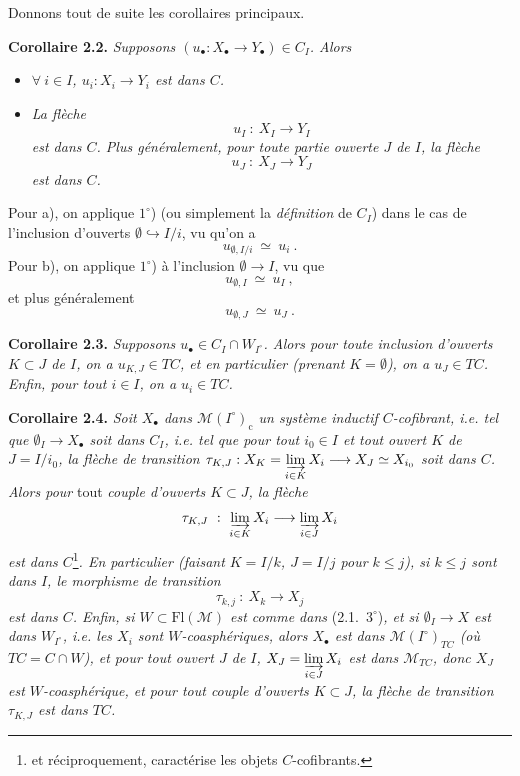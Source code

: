 \documentclass[11pt]{article}
\newcommand{\printedpage}[1]{\marginpar{\footnotesize p.~#1}}
\newcommand{\msp}[1]{\marginpar{\footnotesize [#1]}}
\newcommand{\Fl}{\mathrm{Fl}}
\newcommand{\M}{\mathcal{M}}
\begin{document}
Donnons tout de suite les corollaires principaux.

\textbf{Corollaire 2.2.} \textit{Supposons $(u_\bullet : X_\bullet \longrightarrow Y_\bullet) \in C_I$. Alors}
\begin{itemize}[leftmargin=3em]
\item[a)] \textit{$\forall\ i \in I$, $u_i : X_i \longrightarrow Y_i$ est dans $C$.}
\item[b)] \textit{La flèche}
\[
u_I \ :\ X_I \longrightarrow Y_I
\tag*{(2.2.1)}
\]
\textit{est dans $C$. Plus généralement, pour toute partie ouverte $J$ de $I$, la flèche}
\[
u_J \ :\ X_J \longrightarrow Y_J
\tag*{(2.2.2)}
\]
\textit{est dans $C$.}
\end{itemize}

\printedpage{16}

\msp{page 28}

Pour a), on applique $1^\circ$) (ou simplement la \textit{définition} de $C_I$) dans le cas de l'inclusion d'ouverts $\emptyset \hookrightarrow I/i$, vu qu'on a
\[
u_{\emptyset,I/i} \ \simeq\ u_i \ .
\]
Pour b), on applique $1^\circ$) à l'inclusion $\emptyset \longrightarrow I$, vu que
\[
u_{\emptyset,I} \ \simeq\ u_I \ ,
\]
et plus généralement
\[
u_{\emptyset,J} \ \simeq\ u_J \ .
\]

\textbf{Corollaire 2.3.} \textit{Supposons $u_\bullet \in C_I \cap W_{I^\circ}$. Alors pour toute inclusion d'ouverts $K \subset J$ de $I$, on a $u_{K,J} \in TC$, et en particulier (prenant $K = \emptyset$), on a $u_J \in TC$. Enfin, pour tout $i \in I$, on a $u_i \in TC$.}

\textbf{Corollaire 2.4.} \textit{Soit $X_\bullet$ dans $\M(I^\circ)_{\mathrm{c}}$ un système inductif $C$-cofibrant, i.e. tel que $\emptyset_I \longrightarrow X_\bullet$ soit dans $C_I$, i.e. tel que pour tout $i_0 \in I$ et tout ouvert $K$ de $J = I/i_0$, la flèche de transition $\tau_{K,J} : X_K = \varinjlim\limits_{i\in K} X_i \longrightarrow X_J \simeq X_{i_0}$ soit dans $C$. Alors pour} \textup{tout} \textit{couple d'ouverts $K \subset J$, la flèche}
\[
\tau_{K,J} \ :\ \varinjlim_{i\in K} X_i \longrightarrow \varinjlim_{i\in J} X_i
\]
\textit{est dans $C$}\footnote[12]{et réciproquement, caractérise les objets $C$-cofibrants.}\textit{. En particulier (faisant $K = I/k$, $J = I/j$ pour $k \leq j$), si $k \leq j$ sont dans $I$, le morphisme de transition}
\[
\tau_{k,j} \ :\ X_k \longrightarrow X_j
\]
\msp{page 29}
\textit{est dans $C$. Enfin, si $W \subset \Fl(\M)$ est comme dans} \textup{(2.1.\ $3^\circ$)}\textit{, et si $\emptyset_I \longrightarrow X$ est dans $W_{I^\circ}$, i.e. les $X_i$ sont $W$-coasphériques, alors $X_\bullet$ est dans $\M(I^\circ)_{TC}$ (où $TC = C \cap W$), et pour tout ouvert $J$ de $I$, $X_J = \varinjlim\limits_{i\in J} X_i$ est dans $\M_{TC}$, donc $X_J$ est $W$-coasphérique, et pour tout couple d'ouverts $K \subset J$, la flèche de transition $\tau_{K,J}$ est dans $TC$.}
\end{document}
